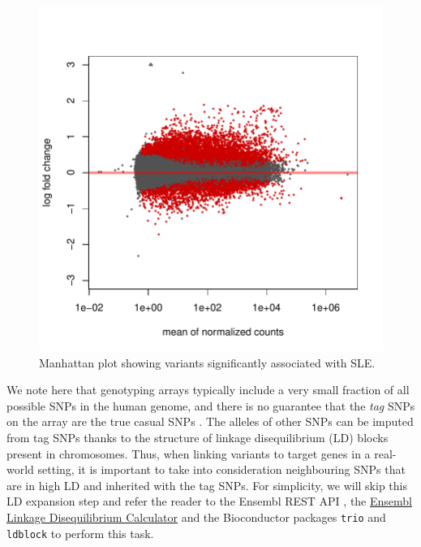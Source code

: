 \documentclass[9pt,a4paper,]{extarticle}
\begin{document}
\begin{figure}

{\centering \includegraphics{biocondutor-regulatory-genomics-workflow_files/figure-latex/figure4-1} 

}

\caption{Manhattan plot showing variants significantly associated with SLE.}\label{fig:figure4}
\end{figure}

We note here that genotyping arrays typically include a very small fraction of all possible SNPs in the human genome, and there is no guarantee that the \emph{tag} SNPs on the array are the true casual SNPs \citep{Bush2012}.
The alleles of other SNPs can be imputed from tag SNPs thanks to the structure of linkage disequilibrium (LD) blocks present in chromosomes.
Thus, when linking variants to target genes in a real-world setting, it is important to take into consideration neighbouring SNPs that are in high LD and inherited with the tag SNPs.
For simplicity, we will skip this LD expansion step and refer the reader to the Ensembl REST API \citep{Yates2015}, the \href{http://www.ensembl.org/Homo_sapiens/Tools/LD?db=core}{Ensembl Linkage Disequilibrium Calculator} and the Bioconductor packages \texttt{trio} \citep{Schwender2015} and \texttt{ldblock} \citep{Carey2017c} to perform this task.
\end{document}
